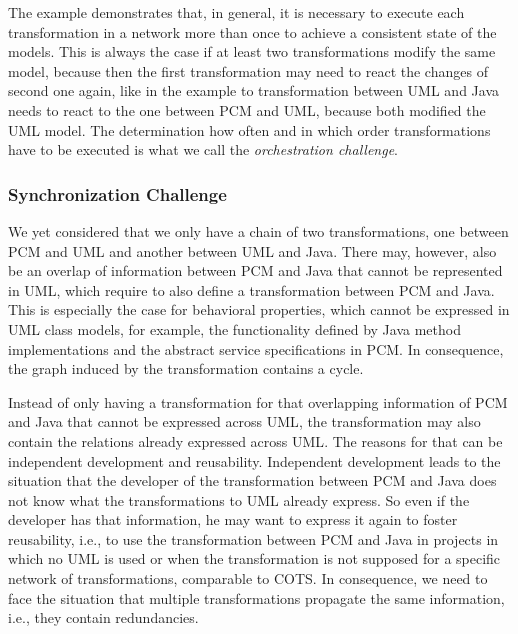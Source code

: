 The example demonstrates that, in general, it is necessary to execute each transformation in a network more than once to achieve a consistent state of the models.
This is always the case if at least two transformations modify the same model, because then the first transformation may need to react the changes of second one again, like in the example to transformation between \gls{UML} and Java needs to react to the one between \gls{PCM} and \gls{UML}, because both modified the \gls{UML} model.
The determination how often and in which order transformations have to be executed is what we call the \emph{orchestration challenge}.

\subsubsection*{Synchronization Challenge}
We yet considered that we only have a chain of two transformations, one between \gls{PCM} and \gls{UML} and another between \gls{UML} and Java.
There may, however, also be an overlap of information between \gls{PCM} and Java that cannot be represented in \gls{UML}, which require to also define a transformation between \gls{PCM} and Java.
This is especially the case for behavioral properties, which cannot be expressed in UML class models, for example, the functionality defined by Java method implementations and the abstract service specifications in \gls{PCM}.
In consequence, the graph induced by the transformation contains a cycle.

Instead of only having a transformation for that overlapping information of \gls{PCM} and Java that cannot be expressed across \gls{UML}, the transformation may also contain the relations already expressed across \gls{UML}.
The reasons for that can be independent development and reusability.
Independent development leads to the situation that the developer of the transformation between \gls{PCM} and Java does not know what the transformations to \gls{UML} already express.
So even if the developer has that information, he may want to express it again to foster reusability, i.e., to use the transformation between \gls{PCM} and Java in projects in which no \gls{UML} is used or when the transformation is not supposed for a specific network of transformations, comparable to \gls{COTS}.
In consequence, we need to face the situation that multiple transformations propagate the same information, i.e., they contain redundancies.


